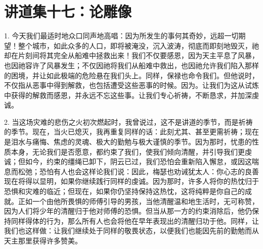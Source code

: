

\section{讲道集十七：论雕像}

\par

1. 今天我们最适时地众口同声地高唱：因为所发生的事何其奇妙，远超一切期望！整个城市，如此众多的人口，即将被淹没，沉入波涛，彻底而即刻地毁灭，祂却在片刻间将其完全从船难中拯救出来！我们不仅要感恩，因为天主平息了风暴，也因祂容许了风暴发生；不仅因祂将我们从船难中救出，也因祂允许我们陷入那样的困境，并让如此极端的危险悬在我们头上。同样，保禄也命令我们。但他说时，不仅指从恶事中得到解救，也包括遭受这些恶事的时候。因为。让我们为这从试炼中获得的解救而感恩，并永远不忘这些事。让我们专心祈祷，不断恳求，并加深虔诚。\par

2. 当这场灾难的悲伤之火初次燃起时，我曾说过，这不是讲道的季节，而是祈祷的季节。现在，当火已熄灭，我再重复同样的话：此刻尤其、甚至更需祈祷；现在是泪水与痛悔、焦虑的灵魂、极大的勤勉与极大谨慎的季节。因为那时，忧患的性质本身，无论我们是否愿意，都约束了我们，使我们倾向清醒，并引导我们更虔诚；但如今，约束的缰绳已卸下，阴云已过，我们恐怕会重新陷入懈怠，或因这喘息而松弛；恐怕有人也会这样论我们说：因此，梅瑟也劝诫犹太人：你心志的良善现在将得以显明，如果你继续践行同样的虔诚。因为那时，许多人将你的热忱归于恐惧和灾难的临近；但现在，如果你仍坚持保持这热忱，这将纯粹是你自己的成就。正如一个由他所畏惧的师傅引导的男孩，当他清醒温和地生活时，无可称赞，因为人们将少年的清醒归于他对师傅的恐惧。但当从那一方的约束消除后，他仍保持同样得体的行为，那么所有人也会将他在早年表现出的清醒归功于他。同样，让我们也这样做：让我们继续处于同样的敬畏状态，以便我们也能因先前的勤勉而从天主那里获得许多赞美。\par

